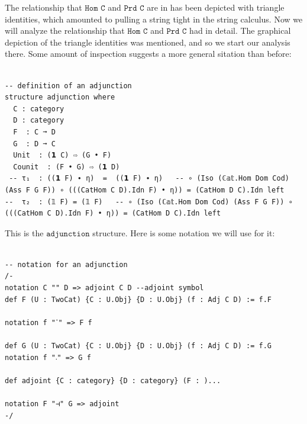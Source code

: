 \documentclass{book}
\newcounter{lcounter}
\begin{document}
The relationship that $\texttt{Hom C}$ and $\texttt{Prd C}$ are in has been depicted with triangle identities, which amounted to pulling a string tight in the string calculus. Now we will analyze the relationship that $\texttt{Hom C}$ and $\texttt{Prd C}$ had in detail. The graphical depiction of the triangle identities was mentioned, and so we start our analysis there. Some amount of inspection suggests a more general sitation than before:\\

\begin{center}
\begin{tcolorbox}[width=5in,colback={white},title={\begin{center}\texttt{Lean \thelcounter} \addtocounter{lcounter}{1}  \end{center}},colbacktitle=Blue,coltitle=black]
\begin{verbatim}

-- definition of an adjunction
structure adjunction where
  C : category
  D : category
  F  : C ➞ D
  G  : D ➞ C
  Unit  : (𝟭 C) ⇨ (G • F)
  Counit  : (F • G) ⇨ (𝟭 D) 
 -- τ₁  : ((𝟭 F) ∙ η)  =  ((𝟭 F) ∙ η)   -- ∘ (Iso (ℂ𝕒𝕥.Hom Dom Cod) (Ass F G F)) ∘ (((CatHom C D).Idn F) • η)) = (CatHom D C).Idn left
--  τ₂  : (𝟙 F) = (𝟙 F)   -- ∘ (Iso (ℂ𝕒𝕥.Hom Dom Cod) (Ass F G F)) ∘ (((CatHom C D).Idn F) • η)) = (CatHom D C).Idn left

\end{verbatim}%
\end{tcolorbox}
\end{center}

This is the $\texttt{adjunction}$ structure. Here is some notation we will use for it:

\begin{center}
\begin{tcolorbox}[width=5in,colback={white},title={\begin{center}\texttt{Lean \thelcounter} \addtocounter{lcounter}{1}  \end{center}},colbacktitle=Green,coltitle=black]
\begin{verbatim}

-- notation for an adjunction
/-
notation C "" D => adjoint C D --adjoint symbol
def F (U : TwoCat) {C : U.Obj} {D : U.Obj} (f : Adj C D) := f.F

notation f "ॱ" => F f

def G (U : TwoCat) {C : U.Obj} {D : U.Obj} (f : Adj C D) := f.G
notation f "𛲔" => G f

def adjoint {C : category} {D : category} (F : )...

notation F "⊣" G => adjoint 
-/

\end{verbatim}%
\end{tcolorbox}
\end{center}
\end{document}
